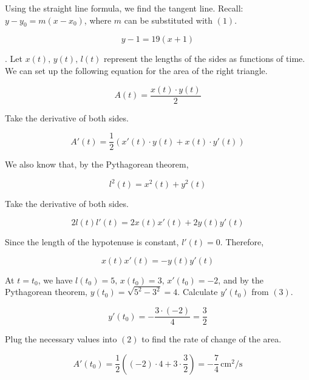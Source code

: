 \documentclass{article}
\begin{document}
\hfill

\noindent Using the straight line formula, we find the tangent line. Recall: $y-y_0=m(x-x_0)$, where $m$ can be substituted with $(1)$.

\[\boxed{y-1=19(x+1)}\]

\hfill

. Let $x(t),\,y(t),\,l(t)$ represent the lengths of the sides as functions of time. We can set up the following equation for the area of the right triangle.

\[A(t) = \frac{x(t)\cdot y(t)}{2}\]

\hfill

\noindent Take the derivative of both sides.

\begin{equation}A'(t) =\frac12\left(x'(t)\cdot y(t) + x(t)\cdot y'(t) \right)\end{equation}

\hfill

\noindent We also know that, by the Pythagorean theorem,

\[l^2(t) = x^2(t)+y^2(t)\]

\hfill

\noindent Take the derivative of both sides.

\[2l(t)l'(t)= 2x(t)x'(t)+2y(t)y'(t)\]

\hfill

\noindent Since the length of the hypotenuse is constant, $l'(t) = 0$. Therefore,

\begin{equation}x(t)x'(t)=-y(t)y'(t)\end{equation}

\hfill

\noindent At $t=t_0$, we have $l(t_0) = 5,\,x(t_0)=3,\,x'(t_0)=-2$, and by the Pythagorean theorem, $y(t_0)=\sqrt{5^2-3^2}=4$. Calculate $y'(t_0)$ from $(3)$.

\[y'(t_0)=-\frac{3\cdot (-2)}4 = \frac32\]

\hfill

\noindent Plug the necessary values into $(2)$ to find the rate of change of the area.

\[A'(t_0) =\frac12\left((-2)\cdot4+3\cdot\frac32\right)=\boxed{-\frac74\,\text{cm}^2/\text{s}}\]
\end{document}
